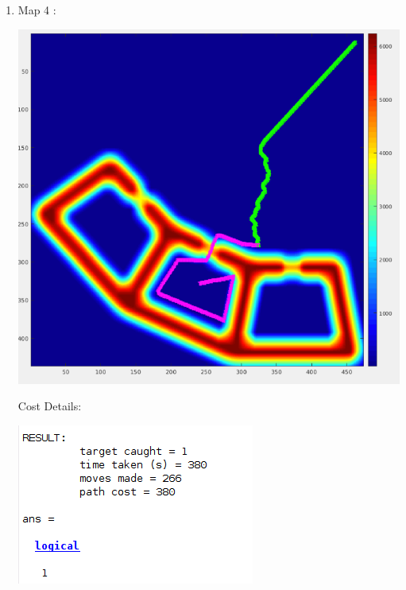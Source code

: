 \documentclass[12pt]{article}
\begin{document}
\begin{enumerate}
    \item Map 4 : 
    \begin{center}
    \includegraphics[scale = 0.4]{16782_HW1_fall19_v2/pictures/map4.png} \\
    \end{center}
    
    Cost Details:
    \begin{center}
    \includegraphics[scale = 0.6]{16782_HW1_fall19_v2/pictures/map4_cost.png} \\
    \end{center}
    
\end{enumerate}
\end{document}

